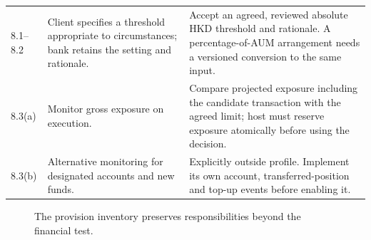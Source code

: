 \begin{longtable}{P{0.14\textwidth}P{0.37\textwidth}P{0.39\textwidth}}
8.1--8.2 & Client specifies a threshold appropriate to circumstances; bank retains the setting and rationale. & Accept an agreed, reviewed absolute HKD threshold and rationale. A percentage-of-AUM arrangement needs a versioned conversion to the same input.\\
8.3(a) & Monitor gross exposure on execution. & Compare projected exposure including the candidate transaction with the agreed limit; host must reserve exposure atomically before using the decision.\\
8.3(b) & Alternative monitoring for designated accounts and new funds. & Explicitly outside profile. Implement its own account, transferred-position and top-up events before enabling it.\\
\bottomrule
\end{longtable}
\begingroup\normalsize
\begin{figure}[H]
\centering
{}
\caption{The provision inventory preserves responsibilities beyond the financial test.}\label{fig:gap-spi-dispositions}
\end{figure}


